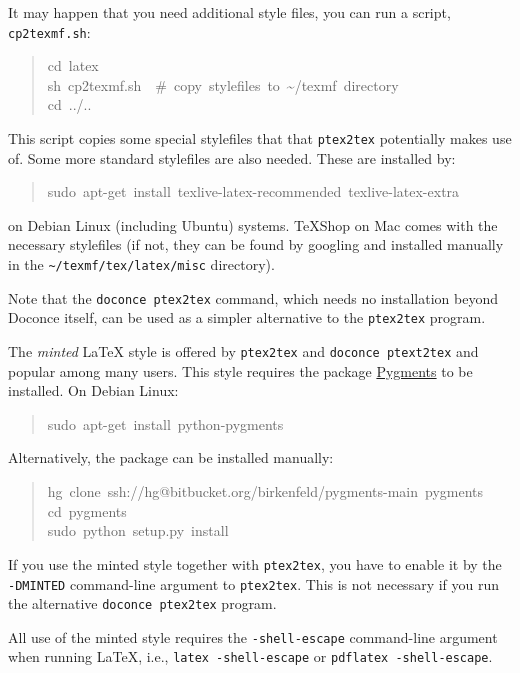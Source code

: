 \documentclass[a4paper]{article}
\begin{document}
It may happen that you need additional style files, you can run
a script, \texttt{cp2texmf.sh}:
%
\begin{quote}{\ttfamily \raggedright \noindent
cd~latex\\
sh~cp2texmf.sh~~\#~copy~stylefiles~to~\textasciitilde{}/texmf~directory\\
cd~../..
}
\end{quote}

This script copies some special stylefiles that
that \texttt{ptex2tex} potentially makes use of. Some more standard stylefiles
are also needed. These are installed by:
%
\begin{quote}{\ttfamily \raggedright \noindent
sudo~apt-get~install~texlive-latex-recommended~texlive-latex-extra
}
\end{quote}

on Debian Linux (including Ubuntu) systems. TeXShop on Mac comes with
the necessary stylefiles (if not, they can be found by googling and installed
manually in the \texttt{\textasciitilde{}/texmf/tex/latex/misc} directory).

Note that the \texttt{doconce ptex2tex} command, which needs no installation
beyond Doconce itself, can be used as a simpler alternative to the \texttt{ptex2tex}
program.

The \emph{minted} LaTeX style is offered by \texttt{ptex2tex} and \texttt{doconce ptext2tex}
and popular among many
users. This style requires the package \href{http://pygments.org}{Pygments}
to be installed. On Debian Linux:
%
\begin{quote}{\ttfamily \raggedright \noindent
sudo~apt-get~install~python-pygments
}
\end{quote}

Alternatively, the package can be installed manually:
%
\begin{quote}{\ttfamily \raggedright \noindent
hg~clone~ssh://hg@bitbucket.org/birkenfeld/pygments-main~pygments\\
cd~pygments\\
sudo~python~setup.py~install
}
\end{quote}

If you use the minted style together with \texttt{ptex2tex}, you have to
enable it by the \texttt{-DMINTED} command-line argument to \texttt{ptex2tex}.
This is not necessary if you run the alternative \texttt{doconce ptex2tex} program.

All use of the minted style requires the \texttt{-shell-escape} command-line
argument when running LaTeX, i.e., \texttt{latex -shell-escape} or \texttt{pdflatex
-shell-escape}.
\end{document}
